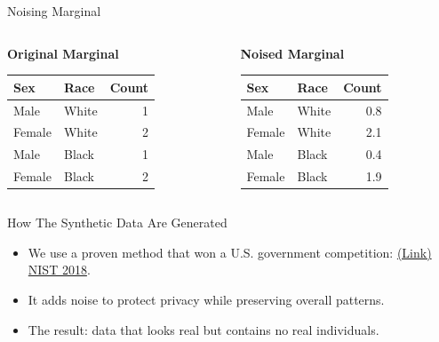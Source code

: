 \documentclass{beamer}
\begin{document}
\begin{frame}{Noising Marginal}
  \begin{columns}
    \begin{column}{0.48\textwidth}
      \centering
      \textbf{Original Marginal}
      \begin{tabular}{|l|l|r|}
        \hline
        \textbf{Sex} & \textbf{Race} & \textbf{Count} \\
        \hline
        Male   & White & 1 \\
        Female & White & 2 \\
        Male   & Black & 1 \\
        Female & Black & 2 \\
        \hline
      \end{tabular}
    \end{column}

    \begin{column}{0.48\textwidth}
      \centering
      \textbf{Noised Marginal}
      \begin{tabular}{|l|l|r|}
        \hline
        \textbf{Sex} & \textbf{Race} & \textbf{Count} \\
        \hline
        Male   & White & 0.8 \\
        Female & White & 2.1 \\
        Male   & Black & 0.4 \\
        Female & Black & 1.9 \\
        \hline
      \end{tabular}
    \end{column}
  \end{columns}
\end{frame}

\begin{frame}{How The Synthetic Data Are Generated}
  \begin{itemize}
    \item We use a proven method that won a U.S. government competition: \href{https://www.nist.gov/ctl/pscr/open-innovation-prize-challenges/past-prize-challenges/2018-differential-privacy-synthetic}{(Link) NIST 2018}.
    \item It adds noise to protect privacy while preserving overall patterns.
    \item The result: data that looks real but contains no real individuals.
  \end{itemize}
\end{frame}
\end{document}
